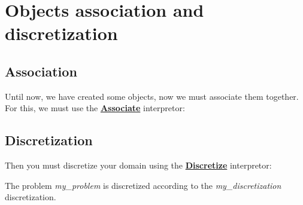 \section{Objects association and discretization}
\subsection{Association}
Until now, we have created some objects, now we must associate them together.
For this, we must use the \href{../../Outils/TRIOXDATA/XTriou/doc.pdf\#associate}{\textbf{Associate}} interpretor:
    \begin{center}
    \end{center}




\subsection{Discretization}
Then you must discretize your domain using the \href{../../Outils/TRIOXDATA/XTriou/doc.pdf\#discretize}{\textbf{Discretize}} interpretor:
    \begin{center}
    \end{center}

The problem \textit{my\_problem} is discretized according to the \textit{my\_discretization} discretization.\\

